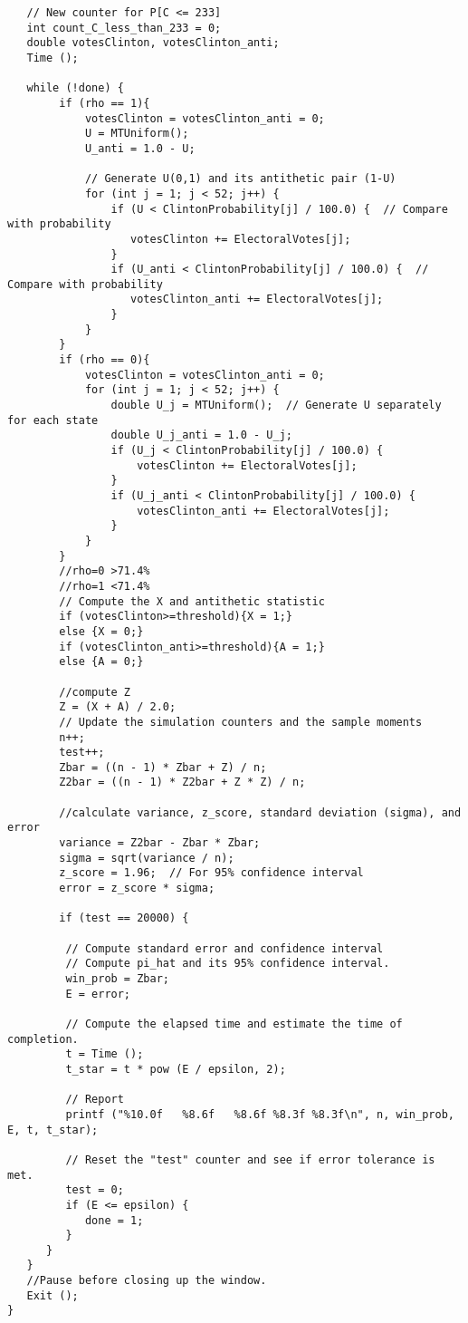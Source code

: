 \documentclass{report}
\begin{document}
\begin{lstlisting}
   // New counter for P[C <= 233]
   int count_C_less_than_233 = 0;
   double votesClinton, votesClinton_anti;
   Time ();

   while (!done) {
        if (rho == 1){
            votesClinton = votesClinton_anti = 0;
            U = MTUniform();
            U_anti = 1.0 - U;
         
            // Generate U(0,1) and its antithetic pair (1-U)
            for (int j = 1; j < 52; j++) {
                if (U < ClintonProbability[j] / 100.0) {  // Compare with probability
                   votesClinton += ElectoralVotes[j];
                }
                if (U_anti < ClintonProbability[j] / 100.0) {  // Compare with probability
                   votesClinton_anti += ElectoralVotes[j];
                }
            }
        }
        if (rho == 0){
            votesClinton = votesClinton_anti = 0;
            for (int j = 1; j < 52; j++) {
                double U_j = MTUniform();  // Generate U separately for each state
                double U_j_anti = 1.0 - U_j;
                if (U_j < ClintonProbability[j] / 100.0) {  
                    votesClinton += ElectoralVotes[j];
                }
                if (U_j_anti < ClintonProbability[j] / 100.0) {  
                    votesClinton_anti += ElectoralVotes[j];
                }
            }
        }
        //rho=0 >71.4%
        //rho=1 <71.4%
        // Compute the X and antithetic statistic
        if (votesClinton>=threshold){X = 1;}
        else {X = 0;}
        if (votesClinton_anti>=threshold){A = 1;}
        else {A = 0;}

        //compute Z
        Z = (X + A) / 2.0;
        // Update the simulation counters and the sample moments
        n++;
        test++;
        Zbar = ((n - 1) * Zbar + Z) / n;
        Z2bar = ((n - 1) * Z2bar + Z * Z) / n;

        //calculate variance, z_score, standard deviation (sigma), and error
        variance = Z2bar - Zbar * Zbar;
        sigma = sqrt(variance / n);
        z_score = 1.96;  // For 95% confidence interval
        error = z_score * sigma;

        if (test == 20000) {

         // Compute standard error and confidence interval
         // Compute pi_hat and its 95% confidence interval.
         win_prob = Zbar;
         E = error;

         // Compute the elapsed time and estimate the time of completion.
         t = Time ();
         t_star = t * pow (E / epsilon, 2);

         // Report
         printf ("%10.0f   %8.6f   %8.6f %8.3f %8.3f\n", n, win_prob, E, t, t_star);

         // Reset the "test" counter and see if error tolerance is met.
         test = 0;
         if (E <= epsilon) {
            done = 1;
         }
      } 
   }
   //Pause before closing up the window.
   Exit ();
}
\end{lstlisting}
\pagebreak
\end{document}

